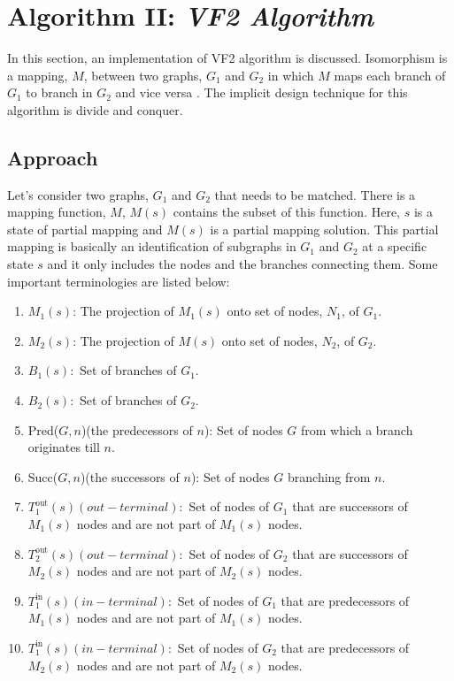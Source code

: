 \documentclass[11pt]{article}
\begin{document}
\section{Algorithm II: \textit{VF2 Algorithm}}
In this section, an implementation of VF2 algorithm is discussed. Isomorphism is a mapping, $M$, between two graphs, $G_1$ and $G_2$ in which $M$ maps each branch of $G_1$ to branch in $G_2$ and vice versa \cite{cordella2001improved}. The implicit design technique for this algorithm is divide and conquer.   

\subsection{Approach}
Let's consider two graphs, $G_1$ and $G_2$ that needs to be matched. There is a mapping function, $M$, $M(s)$ contains the subset of this function. Here, $s$ is a state of partial mapping and $M(s)$ is a partial mapping solution. This partial mapping is basically an identification of subgraphs in $G_1$ and $G_2$ at a specific state $s$ and it only includes the nodes and the branches connecting them. Some important terminologies are listed below:
\begin{enumerate}
    \item $M_1(s)$: The projection of $M_1(s)$ onto set of nodes, $N_1$, of $G_1$.
    \item $M_2(s)$: The projection of $M(s)$ onto set of nodes, $N_2$, of $G_2$.
    \item $B_1(s):$ Set of branches of $G_1$. 
    \item $B_2(s):$ Set of branches of $G_2$.
    \item Pred($G, n$)(the predecessors of $n$): Set of nodes $G$ from which a branch originates till $n$. 
    \item Succ($G, n$)(the successors of $n$): Set of nodes $G$ branching from $n$.
    \item $T^{\text{out}}_1(s)(out-terminal):$ Set of nodes of $G_1$ that are successors of $M_1(s)$ nodes and are not part of $M_1(s)$ nodes.
    \item $T^{\text{out}}_2(s)(out-terminal):$ Set of nodes of $G_2$ that are successors of $M_2(s)$ nodes and are not part of $M_2(s)$ nodes.
    \item $T^{\text{in}}_1(s)(in-terminal):$ Set of nodes of $G_1$ that are predecessors of $M_1(s)$ nodes and are not part of $M_1(s)$ nodes.
    \item $T^{\text{in}}_1(s)(in-terminal):$ Set of nodes of $G_2$ that are predecessors of $M_2(s)$ nodes and are not part of $M_2(s)$ nodes.
\end{enumerate}
\end{document}

